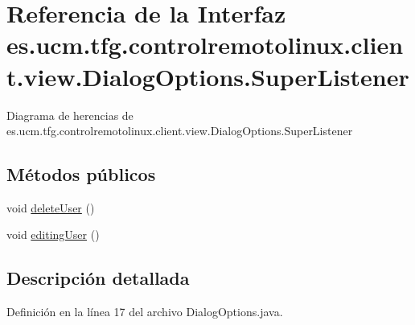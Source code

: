 \hypertarget{interfacees_1_1ucm_1_1tfg_1_1controlremotolinux_1_1client_1_1view_1_1DialogOptions_1_1SuperListener}{\section{Referencia de la Interfaz es.\-ucm.\-tfg.\-controlremotolinux.\-client.\-view.\-Dialog\-Options.\-Super\-Listener}
\label{interfacees_1_1ucm_1_1tfg_1_1controlremotolinux_1_1client_1_1view_1_1DialogOptions_1_1SuperListener}
}


Diagrama de herencias de es.\-ucm.\-tfg.\-controlremotolinux.\-client.\-view.\-Dialog\-Options.\-Super\-Listener
\subsection*{Métodos públicos}
\begin{DoxyCompactItemize}
\item 
void \hyperlink{interfacees_1_1ucm_1_1tfg_1_1controlremotolinux_1_1client_1_1view_1_1DialogOptions_1_1SuperListener_a09b26e7d24ef3be8a7e813b27cdc0e9e}{delete\-User} ()
\item 
void \hyperlink{interfacees_1_1ucm_1_1tfg_1_1controlremotolinux_1_1client_1_1view_1_1DialogOptions_1_1SuperListener_a4c2eb13912ea38bd7e2244fa846277eb}{editing\-User} ()
\end{DoxyCompactItemize}


\subsection{Descripción detallada}


Definición en la línea 17 del archivo Dialog\-Options.\-java.



